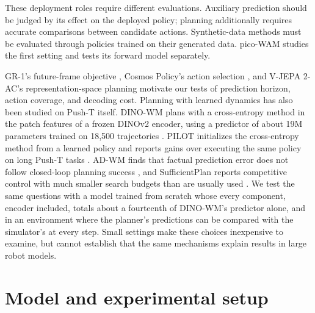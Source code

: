 \documentclass[11pt]{article}
\begin{document}
These deployment roles require different evaluations. Auxiliary prediction should be judged by its effect on the deployed policy; planning additionally requires accurate comparisons between candidate actions. Synthetic-data methods must be evaluated through policies trained on their generated data. pico-WAM studies the first setting and tests its forward model separately.

GR-1's future-frame objective \citep{wu2023gr1}, Cosmos Policy's action selection \citep{kim2026cosmospolicy}, and V-JEPA 2-AC's representation-space planning \citep{assran2025vjepa2} motivate our tests of prediction horizon, action coverage, and decoding cost. Planning with learned dynamics has also been studied on Push-T itself. DINO-WM plans with a cross-entropy method in the patch features of a frozen DINOv2 encoder, using a predictor of about 19M parameters trained on 18,500 trajectories \citep{zhou2024dinowm}. PILOT initializes the cross-entropy method from a learned policy and reports gains over executing the same policy on long Push-T tasks \citep{liu2026pilot}. AD-WM finds that factual prediction error does not follow closed-loop planning success \citep{qiu2026adwm}, and SufficientPlan reports competitive control with much smaller search budgets than are usually used \citep{li2026sufficientplan}. We test the same questions with a model trained from scratch whose every component, encoder included, totals about a fourteenth of DINO-WM's predictor alone, and in an environment where the planner's predictions can be compared with the simulator's at every step. Small settings make these choices inexpensive to examine, but cannot establish that the same mechanisms explain results in large robot models.

\section{Model and experimental setup}
\label{sec:build}
\end{document}
